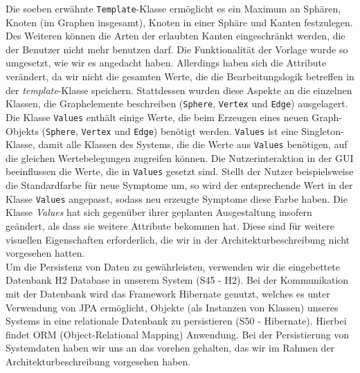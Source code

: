 \documentclass[enabledeprecatedfontcommands,fontsize=11pt,paper=a4,twoside]{scrartcl}
\begin{document}
Die soeben erwähnte \texttt{Template}-Klasse ermöglicht es ein Maximum an Sphären, Knoten (im Graphen insgesamt), Knoten in einer Sphäre und Kanten festzulegen. Des Weiteren können die Arten der erlaubten Kanten eingeschränkt werden, die der Benutzer nicht mehr benutzen darf. Die Funktionalität der Vorlage wurde so umgesetzt, wie wir es angedacht haben. Allerdings haben sich die Attribute verändert, da wir nicht die gesamten Werte, die die Bearbeitungslogik betreffen in der \textit{template}-Klasse speichern. Stattdessen wurden diese Aspekte an die einzelnen Klassen, die Graphelemente beschreiben (\texttt{Sphere}, \texttt{Vertex} und \texttt{Edge}) ausgelagert. \\

Die Klasse \texttt{Values} enthält einige Werte, die beim Erzeugen eines neuen Graph-Objekts (\texttt{Sphere}, \texttt{Vertex} und \texttt{Edge}) benötigt werden. \texttt{Values} ist eine Singleton-Klasse, damit alle Klassen des Systems, die die Werte aus \texttt{Values} benötigen, auf die gleichen Wertebelegungen zugreifen können. Die Nutzerinteraktion in der GUI beeinflussen die Werte, die in \texttt{Values} gesetzt sind. Stellt der Nutzer beispielsweise die Standardfarbe für neue Symptome um, so wird der entsprechende Wert in der Klasse \texttt{Values} angepasst, sodass neu erzeugte Symptome diese Farbe haben. Die Klasse \textit{Values} hat sich gegenüber ihrer geplanten Ausgestaltung insofern geändert, als dass sie weitere Attribute bekommen hat. Diese sind für weitere visuellen Eigenschaften erforderlich, die wir in der Architekturbeschreibung nicht vorgesehen hatten.\\

Um die Persistenz von Daten zu gewährleisten, verwenden wir die eingebettete Datenbank H2 Database in unserem System (S45 - H2). Bei der Kommunikation mit der Datenbank wird das Framework Hibernate genutzt, welches es unter Verwendung von JPA ermöglicht, Objekte (als Instanzen von Klassen) unseres Systems in eine relationale Datenbank zu persistieren (S50 - Hibernate). Hierbei findet ORM (Object-Relational Mapping) Anwendung. Bei der Persistierung von Systemdaten haben wir uns an das vorehen gehalten, das wir im Rahmen der Architekturbeschreibung vorgesehen haben.\\ 
\end{document}
